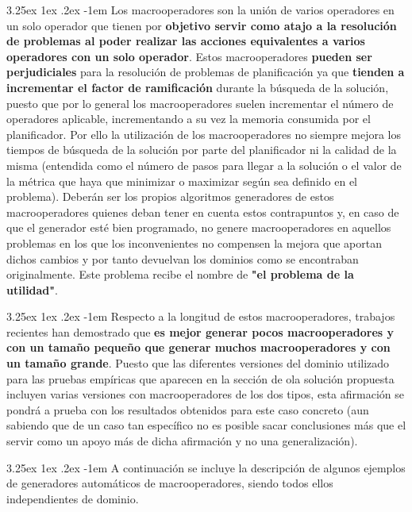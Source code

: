 \documentclass{article}
\makeatletter
\renewcommand\paragraph{\@startsection{paragraph}{5}{\z@}%
      {3.25ex \@plus1ex \@minus.2ex}%
      {-1em}%
      {\normalfont\normalsize\bfseries}}
\makeatother
\begin{document}
    \paragraph{}
    Los macrooperadores son la unión de varios operadores en un solo operador que tienen por \textbf{objetivo servir como atajo a la resolución de problemas al poder realizar las acciones equivalentes a varios operadores con un solo operador}. Estos macrooperadores \textbf{pueden ser perjudiciales} para la resolución de problemas de planificación ya que \textbf{tienden a incrementar el factor de ramificación} durante la búsqueda de la solución, puesto que por lo general los macrooperadores suelen incrementar el número de operadores aplicable, incrementando a su vez la memoria consumida por el planificador. Por ello la utilización de los macrooperadores no siempre mejora los tiempos de búsqueda de la solución por parte del planificador ni la calidad de la misma (entendida como el número de pasos para llegar a la solución o el valor de la métrica que haya que minimizar o maximizar según sea definido en el problema). Deberán ser los propios algoritmos generadores de estos macrooperadores quienes deban tener en cuenta estos contrapuntos y, en caso de que el generador esté bien programado, no genere macrooperadores en aquellos problemas en los que los inconvenientes no compensen la mejora que aportan dichos cambios y por tanto devuelvan los dominios como se encontraban originalmente. Este problema recibe el nombre de \textbf{"el problema de la utilidad"}.
    
    \paragraph{}
    Respecto a la longitud de estos macrooperadores, trabajos recientes han demostrado que \textbf{es mejor generar pocos macrooperadores y con un tamaño pequeño que generar muchos macrooperadores y con un tamaño grande}. Puesto que las diferentes versiones del dominio utilizado para las pruebas empíricas que aparecen en la sección de ola solución propuesta incluyen varias versiones con macrooperadores de los dos tipos, esta afirmación se pondrá a prueba con los resultados obtenidos para este caso concreto (aun sabiendo que de un caso tan específico no es posible sacar conclusiones más que el servir como un apoyo más de dicha afirmación y no una generalización).
    
    \paragraph{}
    A continuación se incluye la descripción de algunos ejemplos de generadores automáticos de macrooperadores, siendo todos ellos independientes de dominio.
    
\end{document}
